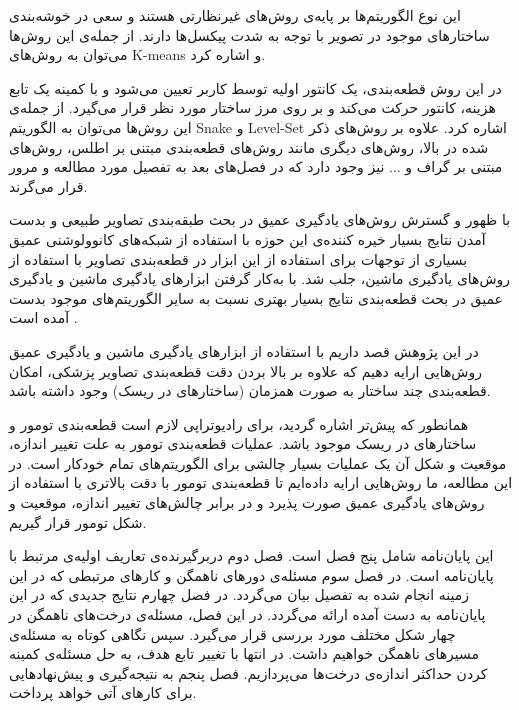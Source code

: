     این نوع الگوریتم‌ها بر پایه‌ی روش‌های غیرنظارتی هستند و سعی در خوشه‌بندی ساختارهای موجود در تصویر با توجه به شدت‌ پیکسل‌ها دارند. از جمله‌ی این روش‌ها می‌توان به روش‌های  K-means و   اشاره کرد.
  
    در این روش قطعه‌بندی، یک کانتور اولیه توسط کاربر تعیین می‌شود و با کمینه یک تابع‌ هزینه، کانتور حرکت می‌کند و بر روی مرز ساختار مورد نظر قرار می‌گیرد. از جمله‌ی این روش‌ها می‌توان به الگوریتم Snake و Level-Set اشاره کرد.
 علاوه بر روش‌های ذکر شده در بالا، روش‌های دیگری مانند روش‌های قطعه‌بندی مبتنی بر اطلس، روش‌های مبتنی بر گراف و ... نیز وجود دارد که در فصل‌های بعد به تفصیل مورد مطالعه و مرور قرار می‌گرند. 
 
 با ظهور و گسترش روش‌های یادگیری عمیق در بحث طبقه‌بندی تصاویر طبیعی و بدست آمدن نتایج بسیار خیره کننده‌ی این حوزه با استفاده از شبکه‌های کانوولوشنی عمیق بسیاری از توجهات برای استفاده از این ابزار در قطعه‌بندی تصاویر با استفاده از  روش‌های یادگیری ماشین، جلب شد. با به‌کار گرفتن ابزارهای یادگیری ماشین و یادگیری عمیق در بحث قطعه‌بندی نتایج بسیار بهتری نسبت به سایر الگوریتم‌های موجود بدست آمده است . 


در این پژوهش قصد داریم با استفاده از ابزارهای یادگیری ماشین و یادگیری عمیق روش‌هایی ارایه دهیم که علاوه بر بالا بردن دقت قطعه‌بندی تصاویر پزشکی، امکان قطعه‌بندی چند ساختار به صورت همزمان  (ساختارهای در ریسک) وجود داشته باشد. 

همانطور که پیش‌تر اشاره گردید، برای رادیوتراپی لازم است قطعه‌بندی تومور و ساختارهای در ریسک موجود باشد. عملیات قطعه‌بندی تومور به علت تغییر اندازه، موقعیت و شکل آن یک عملیات بسیار چالشی برای الگوریتم‌های تمام خودکار است. در این مطالعه، ما روش‌هایی ارایه داده‌ایم تا قطعه‌بندی تومور با دقت بالاتری با استفاده از روش‌های یادگیری عمیق صورت پذیرد و در برابر چالش‌های تغییر اندازه، موقعیت و شکل تومور قرار گیریم.

این پایان‌نامه شامل پنج فصل است. 
فصل دوم دربرگیرنده‌ی تعاریف اولیه‌ی مرتبط با پایان‌نامه است. 
در فصل سوم مسئله‌ی دورهای ناهمگن و کارهای مرتبطی که در این زمینه انجام شده به تفصیل بیان می‌گردد. 
در فصل چهارم نتایج جدیدی که در این پایان‌نامه به دست آمده ارائه می‌گردد. در این فصل، مسئله‌ی درخت‌های ناهمگن در چهار شکل مختلف مورد بررسی قرار می‌گیرد. سپس نگاهی کوتاه به مسئله‌ی مسیرهای ناهمگن خواهیم داشت. در انتها با تغییر تابع هدف، به حل مسئله‌ی کمینه کردن حداکثر اندازه‌ی درخت‌ها می‌پردازیم.
فصل پنجم به نتیجه‌گیری و پیش‌نهادهایی برای کارهای آتی خواهد پرداخت.
